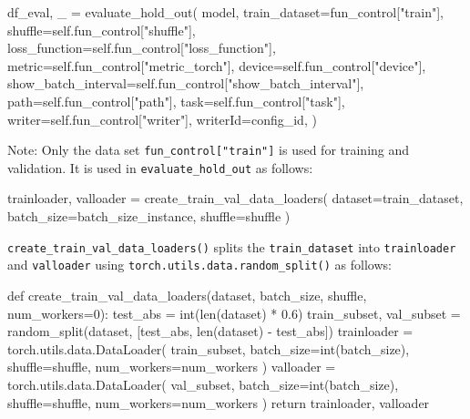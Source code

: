 \documentclass[
  letterpaper,
  DIV=11,
  numbers=noendperiod]{scrreprt}
\newenvironment{Shaded}{\begin{snugshade}}{\end{snugshade}}
\newcommand{\NormalTok}[1]{\textcolor[rgb]{0.00,0.23,0.31}{#1}}
\begin{document}
\begin{Shaded}
\begin{Highlighting}[]
\NormalTok{df\_eval, \_ = evaluate\_hold\_out(}
\NormalTok{    model,}
\NormalTok{    train\_dataset=fun\_control["train"],}
\NormalTok{    shuffle=self.fun\_control["shuffle"],}
\NormalTok{    loss\_function=self.fun\_control["loss\_function"],}
\NormalTok{    metric=self.fun\_control["metric\_torch"],}
\NormalTok{    device=self.fun\_control["device"],}
\NormalTok{    show\_batch\_interval=self.fun\_control["show\_batch\_interval"],}
\NormalTok{    path=self.fun\_control["path"],}
\NormalTok{    task=self.fun\_control["task"],}
\NormalTok{    writer=self.fun\_control["writer"],}
\NormalTok{    writerId=config\_id,}
\NormalTok{)}
\end{Highlighting}
\end{Shaded}

Note: Only the data set \texttt{fun\_control{[}"train"{]}} is used for
training and validation. It is used in \texttt{evaluate\_hold\_out} as
follows:

\begin{Shaded}
\begin{Highlighting}[]
\NormalTok{trainloader, valloader = create\_train\_val\_data\_loaders(}
\NormalTok{                dataset=train\_dataset, batch\_size=batch\_size\_instance, shuffle=shuffle}
\NormalTok{            )}
\end{Highlighting}
\end{Shaded}

\texttt{create\_train\_val\_data\_loaders()} splits the
\texttt{train\_dataset} into \texttt{trainloader} and \texttt{valloader}
using \texttt{torch.utils.data.random\_split()} as follows:

\begin{Shaded}
\begin{Highlighting}[]
\NormalTok{def create\_train\_val\_data\_loaders(dataset, batch\_size, shuffle, num\_workers=0):}
\NormalTok{    test\_abs = int(len(dataset) * 0.6)}
\NormalTok{    train\_subset, val\_subset = random\_split(dataset, [test\_abs, len(dataset) {-} test\_abs])}
\NormalTok{    trainloader = torch.utils.data.DataLoader(}
\NormalTok{        train\_subset, batch\_size=int(batch\_size), shuffle=shuffle, num\_workers=num\_workers}
\NormalTok{    )}
\NormalTok{    valloader = torch.utils.data.DataLoader(}
\NormalTok{        val\_subset, batch\_size=int(batch\_size), shuffle=shuffle, num\_workers=num\_workers}
\NormalTok{    )}
\NormalTok{    return trainloader, valloader}
\end{Highlighting}
\end{Shaded}
\end{document}
